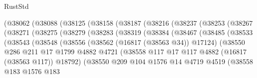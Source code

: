 \begin{lexlean}{RustStd}
\begin{coremodule}
              (@38062
                (@38088
                  (@38125
                    (@38158
                      (@38187
                        (@38216
                          (@38237
                            (@38253
                              (@38267
                                (@38271
                                  (@38275
                                    (@38279
                                      (@38283
                                        (@38319
                                          (@38384
                                            (@38467
                                              (@38485
                                                (@38533
                                                  (@38543
                                                    (@38548
                                                      (@38556
                                                        (@38562 (@16817 (@38563 @34)) @17124)
                                                        (@38550
                                                          @286
                                                          @211
                                                          @17
                                                          @1799
                                                          @4882
                                                          @4721
                                                          (@38558
                                                            @117
                                                            @17
                                                            @117
                                                            @4882
                                                            (@16817 (@38563 @117))
                                                            @18792)
                                                          (@38550
                                                            @209
                                                            @104
                                                            @1576
                                                            @14
                                                            @4719
                                                            @4519
                                                            (@38558
                                                              @183
                                                              @1576
                                                              @183

\end{coremodule}
\end{lexlean}
